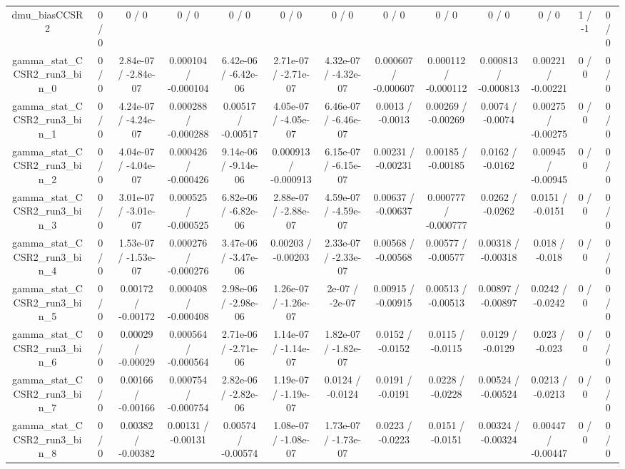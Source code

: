 \documentclass[10pt]{article}
\begin{document}
\begin{table}[htbp]
\begin{center}
\begin{tabular}{|c|c|c|c|c|c|c|c|c|c|c|c|c|}
  dmu_biasCCSR2 & 0 / 0 & 0 / 0 & 0 / 0 & 0 / 0 & 0 / 0 & 0 / 0 & 0 / 0 & 0 / 0 & 0 / 0 & 0 / 0 & 1 / -1 & 0 / 0 \\ 
  gamma_stat_CCSR2_run3_bin_0 & 0 / 0 & 2.84e-07 / -2.84e-07 & 0.000104 / -0.000104 & 6.42e-06 / -6.42e-06 & 2.71e-07 / -2.71e-07 & 4.32e-07 / -4.32e-07 & 0.000607 / -0.000607 & 0.000112 / -0.000112 & 0.000813 / -0.000813 & 0.00221 / -0.00221 & 0 / 0 & 0 / 0 \\ 
  gamma_stat_CCSR2_run3_bin_1 & 0 / 0 & 4.24e-07 / -4.24e-07 & 0.000288 / -0.000288 & 0.00517 / -0.00517 & 4.05e-07 / -4.05e-07 & 6.46e-07 / -6.46e-07 & 0.0013 / -0.0013 & 0.00269 / -0.00269 & 0.0074 / -0.0074 & 0.00275 / -0.00275 & 0 / 0 & 0 / 0 \\ 
  gamma_stat_CCSR2_run3_bin_2 & 0 / 0 & 4.04e-07 / -4.04e-07 & 0.000426 / -0.000426 & 9.14e-06 / -9.14e-06 & 0.000913 / -0.000913 & 6.15e-07 / -6.15e-07 & 0.00231 / -0.00231 & 0.00185 / -0.00185 & 0.0162 / -0.0162 & 0.00945 / -0.00945 & 0 / 0 & 0 / 0 \\ 
  gamma_stat_CCSR2_run3_bin_3 & 0 / 0 & 3.01e-07 / -3.01e-07 & 0.000525 / -0.000525 & 6.82e-06 / -6.82e-06 & 2.88e-07 / -2.88e-07 & 4.59e-07 / -4.59e-07 & 0.00637 / -0.00637 & 0.000777 / -0.000777 & 0.0262 / -0.0262 & 0.0151 / -0.0151 & 0 / 0 & 0 / 0 \\ 
  gamma_stat_CCSR2_run3_bin_4 & 0 / 0 & 1.53e-07 / -1.53e-07 & 0.000276 / -0.000276 & 3.47e-06 / -3.47e-06 & 0.00203 / -0.00203 & 2.33e-07 / -2.33e-07 & 0.00568 / -0.00568 & 0.00577 / -0.00577 & 0.00318 / -0.00318 & 0.018 / -0.018 & 0 / 0 & 0 / 0 \\ 
  gamma_stat_CCSR2_run3_bin_5 & 0 / 0 & 0.00172 / -0.00172 & 0.000408 / -0.000408 & 2.98e-06 / -2.98e-06 & 1.26e-07 / -1.26e-07 & 2e-07 / -2e-07 & 0.00915 / -0.00915 & 0.00513 / -0.00513 & 0.00897 / -0.00897 & 0.0242 / -0.0242 & 0 / 0 & 0 / 0 \\ 
  gamma_stat_CCSR2_run3_bin_6 & 0 / 0 & 0.00029 / -0.00029 & 0.000564 / -0.000564 & 2.71e-06 / -2.71e-06 & 1.14e-07 / -1.14e-07 & 1.82e-07 / -1.82e-07 & 0.0152 / -0.0152 & 0.0115 / -0.0115 & 0.0129 / -0.0129 & 0.023 / -0.023 & 0 / 0 & 0 / 0 \\ 
  gamma_stat_CCSR2_run3_bin_7 & 0 / 0 & 0.00166 / -0.00166 & 0.000754 / -0.000754 & 2.82e-06 / -2.82e-06 & 1.19e-07 / -1.19e-07 & 0.0124 / -0.0124 & 0.0191 / -0.0191 & 0.0228 / -0.0228 & 0.00524 / -0.00524 & 0.0213 / -0.0213 & 0 / 0 & 0 / 0 \\ 
  gamma_stat_CCSR2_run3_bin_8 & 0 / 0 & 0.00382 / -0.00382 & 0.00131 / -0.00131 & 0.00574 / -0.00574 & 1.08e-07 / -1.08e-07 & 1.73e-07 / -1.73e-07 & 0.0223 / -0.0223 & 0.0151 / -0.0151 & 0.00324 / -0.00324 & 0.00447 / -0.00447 & 0 / 0 & 0 / 0 \\ 

\end{tabular}
\end{center}
\end{table}
\end{document}
